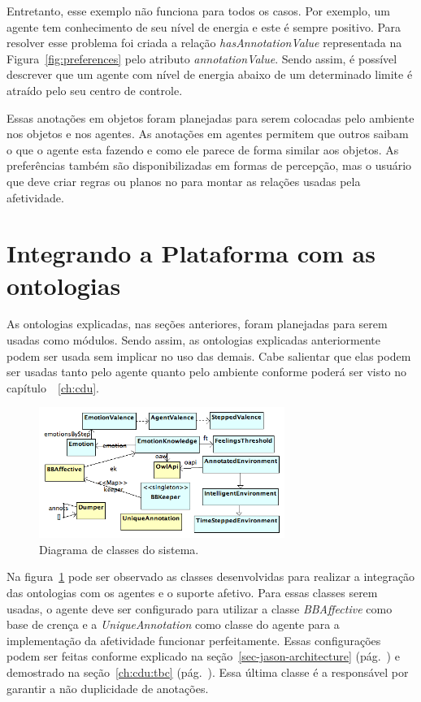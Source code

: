 Entretanto, esse exemplo não funciona para todos os casos. Por exemplo, um
agente tem conhecimento de seu nível de energia e este é sempre positivo. Para
resolver esse problema foi criada a relação \emph{hasAnnotationValue}
representada na Figura~\ref{fig:preferences} pelo atributo
\emph{annotationValue}. Sendo assim, é possível descrever que um agente com
nível de energia abaixo de um determinado limite é atraído pelo seu centro de
controle.

Essas anotações em objetos foram planejadas para serem colocadas pelo ambiente
nos objetos e nos agentes. As anotações em agentes permitem que outros saibam
o que o agente esta fazendo e como ele parece de forma similar aos objetos. As
preferências também são disponibilizadas em formas de percepção, mas o usuário
que deve criar regras ou planos no \jason para montar as relações usadas pela
afetividade.

\section{Integrando a Plataforma \jason com as ontologias} \label{ch:p:ipjo}

As ontologias explicadas, nas seções anteriores, foram planejadas para serem
usadas como módulos. Sendo assim, as ontologias explicadas anteriormente
podem ser usada sem implicar no uso das demais. Cabe salientar que elas podem ser
usadas tanto pelo agente quanto pelo ambiente conforme poderá ser visto no
capítulo~~\ref{ch:cdu}.

\begin{figure}[b]
  \centering
  \includegraphics[width=8cm]{figuras/implementacao-15dez2011.png}
  \caption{Diagrama de classes do sistema.}
  \label{fig:dcs}
\end{figure}

Na figura~\ref{fig:dcs} pode ser observado as classes desenvolvidas para
realizar a integração das ontologias com os agentes \jason e o suporte
afetivo. Para essas classes
serem usadas, o agente deve ser configurado para utilizar a classe
\emph{BBAffective} como base de crença e a \emph{UniqueAnnotation} como classe
do agente para a implementação da afetividade funcionar perfeitamente. Essas
configurações podem ser feitas conforme explicado na
seção~\ref{sec-jason-architecture} (pág.~\pageref{sec-jason-architecture}) e
demostrado na seção~\ref{ch:cdu:tbc} (pág.~\pageref{ch:cdu:tbc}). Essa última
classe é a responsável por garantir a não duplicidade de anotações. %

